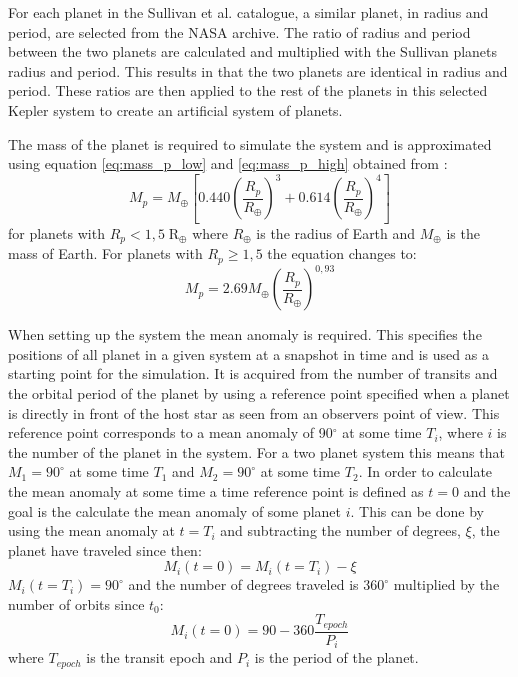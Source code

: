 \documentclass[12pt]{report}
\begin{document}
	For each planet in the Sullivan et al. catalogue, a similar planet, in radius and period, are selected from the NASA archive. The ratio of radius and period between the two planets are calculated and multiplied with the Sullivan planets radius and period. This results in that the two planets are identical in radius and period. These ratios are then applied to the rest of the planets in this selected Kepler system to create an artificial system of planets.  
	
	The mass of the planet is required to simulate the system and is approximated using equation \ref{eq:mass_p_low} and \ref{eq:mass_p_high} obtained from \cite{2015ApJ...809...77S}:
	\begin{equation}
	\label{eq:mass_p_low}
	M_p = M_{\oplus} \left[0.440 \left(\frac{R_p}{R_{\oplus}}\right)^3 + 0.614\left(\frac{R_p}{R_{\oplus}}\right)^4\right]
	\end{equation}
	for planets with $R_p < 1,5 \; \mathrm{R_{\oplus}}$ where $R_{\oplus}$ is the radius of Earth and $M_{\oplus}$ is the mass of Earth. For planets with $R_p \geq 1,5$ the equation changes to:
	\begin{equation}
	\label{eq:mass_p_high}
	M_p = 2.69 M_{\oplus}\left(\frac{R_p}{R_{\oplus}}\right)^{0,93}
	\end{equation}
	
	When setting up the system the mean anomaly is required. This specifies the positions of all planet in a given system at a snapshot in time and is used as a starting point for the simulation. It is acquired from the number of transits and the orbital period of the planet by using a reference point specified when a planet is directly in front of the host star as seen from an observers point of view. This reference point corresponds to a mean anomaly of 90$^{\circ}$ at some time $T_i$, where $i$ is the number of the planet in the system. For a two planet system this means that $M_1=90^{\circ}$ at some time $T_1$ and $M_2=90^{\circ}$ at some time $T_2$. In order to calculate the mean anomaly at some time a time reference point is defined as $t=0$ and the goal is the calculate the mean anomaly of some planet $i$. This can be done by using the mean anomaly at $t = T_i$ and subtracting the number of degrees, $\xi$, the planet have traveled since then:
\begin{equation}
	M_i(t=0) = M_i(t=T_i) - \xi
\end{equation}
	$M_i(t=T_i) = 90^{\circ}$ and the number of degrees traveled is $360^{\circ}$ multiplied by the number of orbits since $t_0$:
\begin{equation}
	M_i(t=0) = 90 - 360 \frac{T_{epoch}}{P_i}
\end{equation}
	where $T_{epoch}$ is the transit epoch and $P_i$ is the period of the planet.
	
\end{document}
